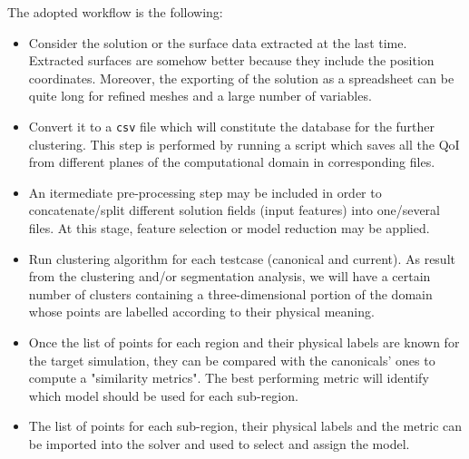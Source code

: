 \vspace{10pt}
\noindent The adopted workflow is the following:
\begin{itemize}
    \item Consider the solution or the surface data extracted at the last time. Extracted surfaces are somehow better because they include the position coordinates. Moreover, the exporting of the solution as a spreadsheet can be quite long for refined meshes and a large number of variables.
    \item Convert it to a \texttt{csv} file which will constitute the database for the further clustering. This step is performed by running a script which saves all the QoI from different planes of the computational domain in corresponding files.
    \item An itermediate pre-processing step may be included in order to concatenate/split different solution fields (input features) into one/several files. At this stage, feature selection or model reduction may be applied.
    \item Run clustering algorithm for each testcase (canonical and current). {As result from the clustering and/or segmentation analysis, we will have a certain number of clusters containing a three-dimensional portion of the domain whose points are labelled according to their physical meaning.} 
    \item Once the list of points for each region and their physical labels are known for the target simulation, they can be compared with the canonicals' ones to compute a "similarity metrics". The best performing metric will identify which model should be used for each sub-region.
    \item The list of points for each sub-region, their physical labels and the metric can be imported into the solver and used to select and assign the model.
\end{itemize}

